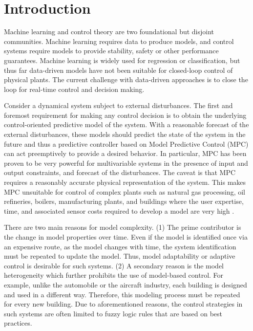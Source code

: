 \section{Introduction}


Machine learning and control theory are two foundational but disjoint communities.
Machine learning requires data to produce models, and control systems require models to provide stability, safety or other performance guarantees.
Machine learning is widely used for regression or classification, but thus far data-driven models have not been suitable for closed-loop control of physical plants.
The current challenge with data-driven approaches is to close the loop for real-time control and decision making.

Consider a dynamical system subject to external disturbances.
The first and foremost requirement for making any control decision is to obtain the underlying control-oriented predictive model of the system.
With a reasonable forecast of the external disturbances, these models should predict the state of the system in the future and thus a predictive controller based on Model Predictive Control (MPC) can act preemptively to provide a desired behavior.
In particular, MPC has been proven to be very powerful for multivariable systems in the presence of input and output constraints, and forecast of the disturbances.
The caveat is that MPC requires a reasonably accurate physical representation of the system.
This makes MPC unsuitable for control of complex plants such as natural gas processing, oil refineries, boilers, manufacturing plants, and buildings where the user expertise, time, and associated sensor costs required to develop a model are very high \cite{Sturzenegger2016,vzavcekova2014}.

There are two main reasons for model complexity. 
(1) The prime contributor is the change in model properties over time. Even if the model is identified once via an expensive route, as the model changes with time, the system identification must be repeated to update the model. Thus, model adaptability or adaptive control is desirable for such systems. 
(2) A secondary reason is the model heterogeneity which further prohibits the use of model-based control. For example, unlike the automobile or the aircraft industry, each building is designed and used in a different way. Therefore, this modeling process must be repeated for every new building. 
Due to aforementioned reasons, the control strategies in such systems are often limited to fuzzy logic rules that are based on best practices. 

